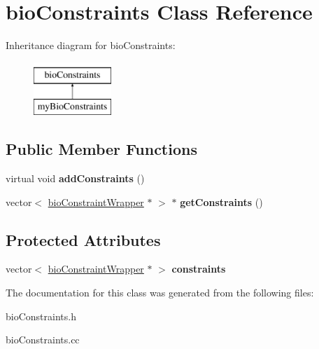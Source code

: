 \hypertarget{classbio_constraints}{}\section{bio\+Constraints Class Reference}
\label{classbio_constraints}
Inheritance diagram for bio\+Constraints\+:\begin{figure}[H]
\begin{center}
\leavevmode
\includegraphics[height=2.000000cm]{classbio_constraints}
\end{center}
\end{figure}
\subsection*{Public Member Functions}
\begin{DoxyCompactItemize}
\item 
\mbox{\label{classbio_constraints_a577db0ac399347c1bee071f6bddd109c}} 
virtual void {\bfseries add\+Constraints} ()
\item 
\mbox{\label{classbio_constraints_aaec73e60746cf28fe003bc26a2ade57e}} 
vector$<$ \hyperlink{classbio_constraint_wrapper}{bio\+Constraint\+Wrapper} $\ast$ $>$ $\ast$ {\bfseries get\+Constraints} ()
\end{DoxyCompactItemize}
\subsection*{Protected Attributes}
\begin{DoxyCompactItemize}
\item 
\mbox{\label{classbio_constraints_a251bcc1ad11f782c8f78339e781ad105}} 
vector$<$ \hyperlink{classbio_constraint_wrapper}{bio\+Constraint\+Wrapper} $\ast$ $>$ {\bfseries constraints}
\end{DoxyCompactItemize}


The documentation for this class was generated from the following files\+:\begin{DoxyCompactItemize}
\item 
bio\+Constraints.\+h\item 
bio\+Constraints.\+cc\end{DoxyCompactItemize}
